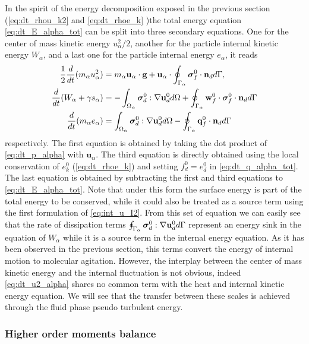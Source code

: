In the spirit of the energy decomposition exposed in the previous section (\ref{eq:dt_rhou_k2} and \ref{eq:dt_rhoe_k} )the total energy equation \ref{eq:dt_E_alpha_tot} can be split into three secondary equations. 
One for the center of mass kinetic energy $u_\alpha^2/2$, another for the particle internal kinetic energy $W_\alpha$, and a last one for the particle internal energy $e_\alpha$, it reads
\begin{align}
    \label{eq:dt_u2_alpha}
    \frac{1}{2}\frac{d}{dt} (m_\alpha u_\alpha^2)
    &= 
    m_\alpha\textbf{u}_\alpha\cdot
    \textbf{g}
    + 
    \textbf{u}_\alpha\cdot
    \oint_{\Gamma_{\alpha}} \bm\sigma_f^0 \cdot \textbf{n}_d d\Gamma,\\
    \label{eq:dt_w2_alpha}
    \frac{d}{dt} (W_\alpha + \gamma s_\alpha)
    &= 
    - \int_{\Omega_{\alpha}}  \bm{\sigma}_d^0 : \mathbf{\nabla}\textbf{u}_d^0  d\Omega
    + \oint_{\Gamma_{\alpha}} \textbf{w}_f^0 \cdot \bm{\sigma}_f^0 \cdot \textbf{n}_d  d\Gamma
    \\
     \label{eq:dt_e_alpha}
    \frac{d}{dt} (m_\alpha e_\alpha )
    &= 
     \int_{\Omega_{\alpha}}  \bm{\sigma}_d^0 : \mathbf{\nabla}\textbf{u}_d^0   d\Omega
    -  \oint_{\Gamma_{\alpha}} \textbf{q}_f^0\cdot \textbf{n}_d  d\Gamma 
\end{align}
respectively. 
The first equation is obtained by taking the dot product of \ref{eq:dt_p_alpha} with $\textbf{u}_\alpha$. 
The third equation is directly obtained using the local conservation of $e_k^0$ (\ref{eq:dt_rhoe_k}) and setting $f_d^0 = e_d^0$ in \ref{eq:dt_q_alpha_tot}.
The last equation is obtained by subtracting the first and third equations to \ref{eq:dt_E_alpha_tot}. 
Note that under this form the surface energy is part of the total energy to be conserved, while it could also be treated as a source term using the first formulation of \ref{eq:int_u_I2}.
From this set of equation we can easily see that the rate of dissipation terms $\oint_{\Gamma_{\alpha}} \bm{\sigma}_d^0 : \mathbf{\nabla}\textbf{u}_d^0 d\Gamma$ represent an energy sink in the equation of $W_\alpha$ while it is a source term in the internal energy equation. 
As it has been observed in the previous section, this terms convert the energy of internal motion to molecular agitation. 
However, the interplay between the center of mass  kinetic energy and the internal fluctuation is not obvious, indeed \ref{eq:dt_u2_alpha} shares no common term with the heat and internal kinetic energy equation.
We will see that the transfer between these scales is achieved through the fluid phase pseudo turbulent energy. 



\subsubsection{Higher order moments balance}


